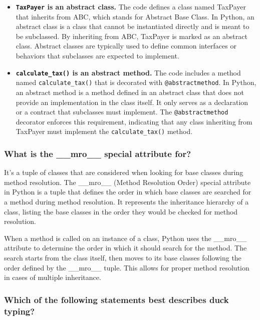 \begin{itemize}
\item \textbf{\texttt{TaxPayer} is an abstract class.} The code defines a class named TaxPayer that inherits from ABC, which stands for Abstract Base Class. In Python, an abstract class is a class that cannot be instantiated directly and is meant to be subclassed. By inheriting from ABC, TaxPayer is marked as an abstract class. Abstract classes are typically used to define common interfaces or behaviors that subclasses are expected to implement.
\item \textbf{\texttt{calculate\_tax()} is an abstract method.} The code includes a method named \texttt{calculate\_tax()} that is decorated with \texttt{@abstractmethod}. In Python, an abstract method is a method defined in an abstract class that does not provide an implementation in the class itself. It only serves as a declaration or a contract that subclasses must implement. The \texttt{@abstractmethod} decorator enforces this requirement, indicating that any class inheriting from TaxPayer must implement the \texttt{calculate\_tax()} method.
\end{itemize}

\subsubsection{What is the \_\_mro\_\_ special attribute for?}

It's a tuple of classes that are considered when looking for base classes during method resolution. The \_\_mro\_\_ (Method Resolution Order) special attribute in Python is a tuple that defines the order in which base classes are searched for a method during method resolution. It represents the inheritance hierarchy of a class, listing the base classes in the order they would be checked for method resolution.

When a method is called on an instance of a class, Python uses the \_\_mro\_\_ attribute to determine the order in which it should search for the method. The search starts from the class itself, then moves to its base classes following the order defined by the \_\_mro\_\_ tuple. This allows for proper method resolution in cases of multiple inheritance.

\subsubsection{Which of the following statements best describes duck typing?}

